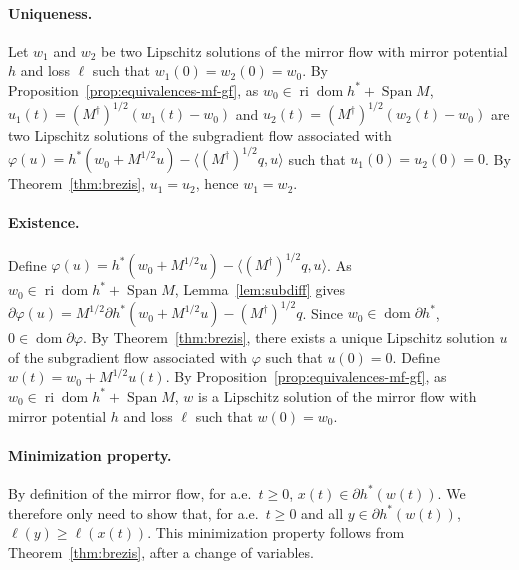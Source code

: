 \documentclass[11pt,english,reqno]{article}
\DeclareMathOperator{\Span}{Span}
\DeclareMathOperator{\dom}{dom}
\DeclareMathOperator{\ri}{ri}
\renewcommand{\geq}{\geqslant}
\theoremstyle{plain}
\theoremstyle{definition}
\theoremstyle{remark}
\numberwithin{equation}{section}
\begin{document}
\paragraph{Uniqueness.} Let $w_1$ and $w_2$ be two Lipschitz solutions of the mirror flow with mirror potential $h$ and loss $\ell$ such that $w_1(0) = w_2(0) = w_0$. By Proposition~\ref{prop:equivalences-mf-gf}, as $w_0 \in \ri \dom h^* + \Span M$, $u_1(t) = (M^\dagger)^{1/2} (w_1(t) - w_0)$ and $u_2(t) = (M^\dagger)^{1/2} (w_2(t) - w_0)$ are two Lipschitz solutions of the subgradient flow associated with $\varphi(u) = h^*(w_0 + M^{1/2} u) - \langle (M^\dagger)^{1/2} q , u \rangle$ such that $u_1(0) = u_2(0) = 0$. By Theorem~\ref{thm:brezis}, $u_1 = u_2$, hence $w_1 = w_2$.

\paragraph{Existence.} Define $\varphi(u) = h^*(w_0 + M^{1/2} u) - \langle (M^\dagger)^{1/2} q , u \rangle$. As $w_0 \in \ri \dom h^* + \Span M$, Lemma~\ref{lem:subdiff} gives $\partial \varphi(u) = M^{1/2} \partial h^*(w_0 + M^{1/2} u) - (M^\dagger)^{1/2} q$. Since $w_0 \in \dom \partial h^*$, $0 \in \dom \partial \varphi$. By Theorem~\ref{thm:brezis}, there exists a unique Lipschitz solution $u$ of the subgradient flow associated with $\varphi$ such that $u(0) = 0$. Define $w(t) = w_0 + M^{1/2} u(t)$. By Proposition~\ref{prop:equivalences-mf-gf}, as $w_0 \in \ri \dom h^* + \Span M$, $w$ is a Lipschitz solution of the mirror flow with mirror potential $h$ and loss $\ell$ such that $w(0) = w_0$.

\paragraph{Minimization property.} By definition of the mirror flow, for a.e.~$t \geq 0$, $x(t) \in \partial h^*(w(t))$. We therefore only need to show that, for a.e.~$t \geq 0$ and all $y \in \partial h^*(w(t))$, $\ell(y) \geq \ell(x(t))$. This minimization property follows from Theorem~\ref{thm:brezis}, after a change of variables.
\end{document}
